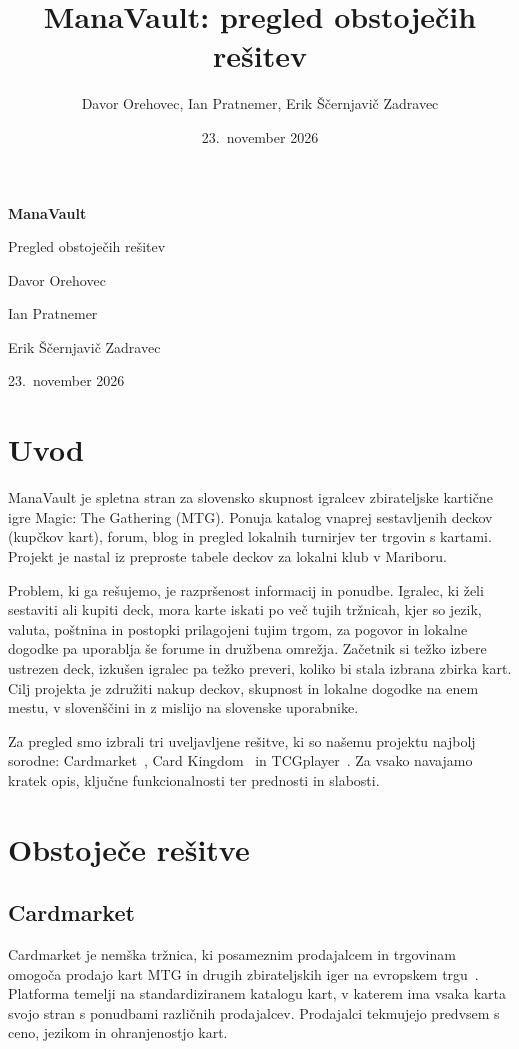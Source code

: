 \documentclass[11pt,a4paper]{article}
\title{ManaVault: pregled obstoječih rešitev}
\author{Davor Orehovec, Ian Pratnemer, Erik Ščernjavič Zadravec}
\date{23.~november 2026}
\begin{document}
\begin{titlepage}
  \centering
  \vspace*{3cm}
  {\Huge\bfseries ManaVault\par}
  \vspace{0.6cm}
  {\Large Pregled obstoječih rešitev\par}
  \vspace{2.5cm}
  {\large Davor Orehovec\par
  Ian Pratnemer\par
  Erik Ščernjavič Zadravec\par}
  \vfill
  {\large 23.~november 2026\par}
\end{titlepage}

\tableofcontents
\newpage

\section{Uvod}
ManaVault je spletna stran za slovensko skupnost igralcev zbirateljske kartične igre Magic: The Gathering (MTG). Ponuja katalog vnaprej sestavljenih deckov (kupčkov kart), forum, blog in pregled lokalnih turnirjev ter trgovin s kartami. Projekt je nastal iz preproste tabele deckov za lokalni klub v Mariboru.

Problem, ki ga rešujemo, je razpršenost informacij in ponudbe. Igralec, ki želi sestaviti ali kupiti deck, mora karte iskati po več tujih tržnicah, kjer so jezik, valuta, poštnina in postopki prilagojeni tujim trgom, za pogovor in lokalne dogodke pa uporablja še forume in družbena omrežja. Začetnik si težko izbere ustrezen deck, izkušen igralec pa težko preveri, koliko bi stala izbrana zbirka kart. Cilj projekta je združiti nakup deckov, skupnost in lokalne dogodke na enem mestu, v slovenščini in z mislijo na slovenske uporabnike.

Za pregled smo izbrali tri uveljavljene rešitve, ki so našemu projektu najbolj sorodne: Cardmarket~\cite{cm}, Card Kingdom~\cite{ck} in TCGplayer~\cite{tcg}. Za vsako navajamo kratek opis, ključne funkcionalnosti ter prednosti in slabosti.

\section{Obstoječe rešitve}

\subsection{Cardmarket}
Cardmarket je nemška tržnica, ki posameznim prodajalcem in trgovinam omogoča prodajo kart MTG in drugih zbirateljskih iger na evropskem trgu~\cite{cm}. Platforma temelji na standardiziranem katalogu kart, v katerem ima vsaka karta svojo stran s ponudbami različnih prodajalcev. Prodajalci tekmujejo predvsem s ceno, jezikom in ohranjenostjo kart.
\end{document}
